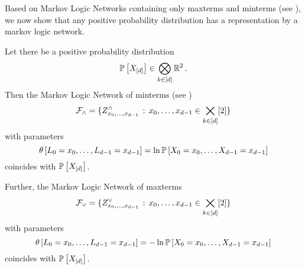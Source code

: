 \label{sec:MLNMaxMintermRep}

Based on Markov Logic Networks containing only maxterms and minterms (see ), we now show that any positive probability distribution has a representation by a markov logic network.

\begin{theorem}
    \label{the:maximalClausesRepresentation}\label{the:mintermExpressivityMLN}
    Let there be a positive probability distribution
    \[ \mathbb{P}\left[X_{[d]}\right] \in \bigotimes_{k\in[d]}\mathbb{R}^2 \, . \]
    Then the Markov Logic Network of minterms (see )
    \[ \mathcal{F}_{\land} = \{Z^{\land}_{{x_{0},\ldots,x_{d-1}}} \, : \, {x_{0},\ldots,x_{d-1}}\in\bigtimes_{k\in[d]}[2] \}\]
    with parameters %
    \[ \canparamat{\selvariableof{0}=\catindexof{0},\ldots,\selvariableof{\atomorder-1}=\catindexof{\atomorder-1}}%
    = \ln \probat{\indexedcatvariables} \]
    coincides with $\mathbb{P}\left[X_{[d]}\right]$.

    Further, the Markov Logic Network of maxterms
    \[ \mathcal{F}_{\lor} = \{Z^{\lor}_{{x_{0},\ldots,x_{d-1}}} \, : \, {x_{0},\ldots,x_{d-1}}\in\bigtimes_{k\in[d]}[2] \}\]
    with parameters
    \[ \canparamat{\selvariableof{0}=\catindexof{0},\ldots,\selvariableof{\atomorder-1}=\catindexof{\atomorder-1}} %
    = - \ln\probat{\indexedcatvariables} \]
    coincides with $\mathbb{P}\left[X_{[d]}\right]$.
\end{theorem}
